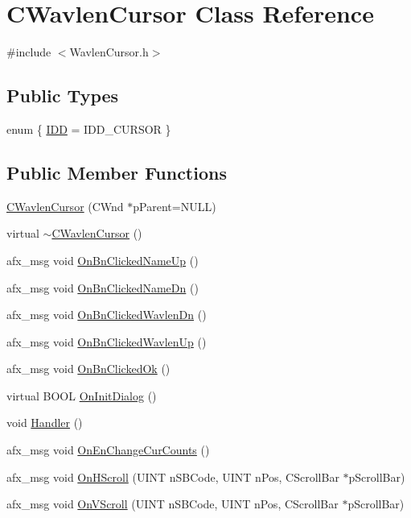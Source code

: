 \hypertarget{classCWavlenCursor}{
\section{CWavlenCursor Class Reference}
\label{classCWavlenCursor}
}


{\ttfamily \#include $<$WavlenCursor.h$>$}

\subsection*{Public Types}
\begin{DoxyCompactItemize}
\item 
enum \{ \hyperlink{classCWavlenCursor_a96d76ca77dadc0d696e093e1b8c25359abf71df3d9858c0f33aa3a09d1c635577}{IDD} =  IDD\_\-CURSOR
 \}
\end{DoxyCompactItemize}
\subsection*{Public Member Functions}
\begin{DoxyCompactItemize}
\item 
\hyperlink{classCWavlenCursor_a810778d0b494afa63b4ea07e5532d88e}{CWavlenCursor} (CWnd $\ast$pParent=NULL)
\item 
virtual \hyperlink{classCWavlenCursor_a70cf9d6052cf2b1d81c31a876f21904d}{$\sim$CWavlenCursor} ()
\item 
afx\_\-msg void \hyperlink{classCWavlenCursor_a3f255fea1e4f07e167c45d182930bec9}{OnBnClickedNameUp} ()
\item 
afx\_\-msg void \hyperlink{classCWavlenCursor_a48dd66ed252d8b3147e825e13904fbd2}{OnBnClickedNameDn} ()
\item 
afx\_\-msg void \hyperlink{classCWavlenCursor_a3702a1e2ebf267b926d96a790881d2d6}{OnBnClickedWavlenDn} ()
\item 
afx\_\-msg void \hyperlink{classCWavlenCursor_aaed72434a6ce511bf9bbe5a901031d55}{OnBnClickedWavlenUp} ()
\item 
afx\_\-msg void \hyperlink{classCWavlenCursor_ab3f463add780e47f75d912c10c0d1fa2}{OnBnClickedOk} ()
\item 
virtual BOOL \hyperlink{classCWavlenCursor_aaa0d3f5df823608dab62c7bd5a4d993b}{OnInitDialog} ()
\item 
void \hyperlink{classCWavlenCursor_ac4108fd970bd6b8509132021e5097ab1}{Handler} ()
\item 
afx\_\-msg void \hyperlink{classCWavlenCursor_a610780853de43fea97483d15525d8332}{OnEnChangeCurCounts} ()
\item 
afx\_\-msg void \hyperlink{classCWavlenCursor_acff7f35ae586a363021f4d1687ae3a86}{OnHScroll} (UINT nSBCode, UINT nPos, CScrollBar $\ast$pScrollBar)
\item 
afx\_\-msg void \hyperlink{classCWavlenCursor_a01e20fdcce2b0ffc7c3a37d2caaabba1}{OnVScroll} (UINT nSBCode, UINT nPos, CScrollBar $\ast$pScrollBar)
\end{DoxyCompactItemize}
